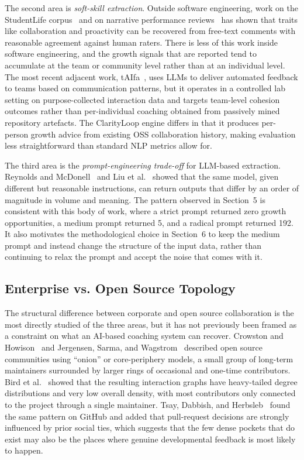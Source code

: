 \documentclass[a4paper,UKenglish,cleveref,autoref]{lipics-v2021}
\begin{document}
The second area is \textit{soft-skill extraction}. Outside software engineering, work on the StudentLife corpus~\cite{wang2014studentlife} and on narrative performance reviews~\cite{speer2021scoring} has shown that traits like collaboration and proactivity can be recovered from free-text comments with reasonable agreement against human raters. There is less of this work inside software engineering, and the growth signals that are reported tend to accumulate at the team or community level rather than at an individual level. The most recent adjacent work, tAIfa~\cite{almutairi2025taifa}, uses LLMs to deliver automated feedback to teams based on communication patterns, but it operates in a controlled lab setting on purpose-collected interaction data and targets team-level cohesion outcomes rather than per-individual coaching obtained from passively mined repository artefacts. The ClarityLoop engine differs in that it produces per-person growth advice from existing OSS collaboration history, making evaluation less straightforward than standard NLP metrics allow for.

The third area is the \textit{prompt-engineering trade-off} for LLM-based extraction. Reynolds and McDonell~\cite{reynolds2021prompt} and Liu et al.~\cite{liu2023pretrain} showed that the same model, given different but reasonable instructions, can return outputs that differ by an order of magnitude in volume and meaning. The pattern observed in Section~5 is consistent with this body of work, where a strict prompt returned zero growth opportunities, a medium prompt returned 5, and a radical prompt returned 192. It also motivates the methodological choice in Section~6 to keep the medium prompt and instead change the structure of the input data, rather than continuing to relax the prompt and accept the noise that comes with it.

\subsection{Enterprise vs. Open Source Topology}
The structural difference between corporate and open source collaboration is the most directly studied of the three areas, but it has not previously been framed as a constraint on what an AI-based coaching system can recover. Crowston and Howison~\cite{crowston2005social} and Jergensen, Sarma, and Wagstrom~\cite{jergensen2011onion} described open source communities using ``onion'' or core-periphery models, a small group of long-term maintainers surrounded by larger rings of occasional and one-time contributors. Bird et al.~\cite{bird2008latent} showed that the resulting interaction graphs have heavy-tailed degree distributions and very low overall density, with most contributors only connected to the project through a single maintainer. Tsay, Dabbish, and Herbsleb~\cite{tsay2014influence} found the same pattern on GitHub and added that pull-request decisions are strongly influenced by prior social ties, which suggests that the few dense pockets that do exist may also be the places where genuine developmental feedback is most likely to happen.
\end{document}
